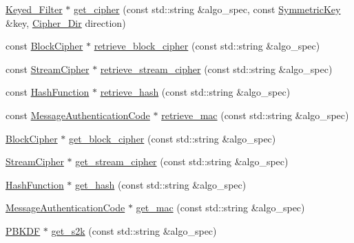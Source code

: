 \begin{DoxyCompactItemize}
\item 
\hyperlink{classBotan_1_1Keyed__Filter}{Keyed\-\_\-\-Filter} $\ast$ \hyperlink{namespaceBotan_a60f4b2b897a27635c66f5b111ccdaa61}{get\-\_\-cipher} (const std\-::string \&algo\-\_\-spec, const \hyperlink{namespaceBotan_a00c78597211d5c63b63e2a57ddb96d38}{Symmetric\-Key} \&key, \hyperlink{namespaceBotan_ad9d14ffdc73fc19966421979b32ee759}{Cipher\-\_\-\-Dir} direction)
\item 
const \hyperlink{classBotan_1_1BlockCipher}{Block\-Cipher} $\ast$ \hyperlink{namespaceBotan_a225427db41ff1be9e376e0ee184ca608}{retrieve\-\_\-block\-\_\-cipher} (const std\-::string \&algo\-\_\-spec)
\item 
const \hyperlink{classBotan_1_1StreamCipher}{Stream\-Cipher} $\ast$ \hyperlink{namespaceBotan_ada7fc76d5b519d1a4565c340d62e1952}{retrieve\-\_\-stream\-\_\-cipher} (const std\-::string \&algo\-\_\-spec)
\item 
const \hyperlink{classBotan_1_1HashFunction}{Hash\-Function} $\ast$ \hyperlink{namespaceBotan_af3a6138a953ee6377a9dc74edc6db5ee}{retrieve\-\_\-hash} (const std\-::string \&algo\-\_\-spec)
\item 
const \hyperlink{classBotan_1_1MessageAuthenticationCode}{Message\-Authentication\-Code} $\ast$ \hyperlink{namespaceBotan_acb0e06ae53e6801bf9218b7447c97ff5}{retrieve\-\_\-mac} (const std\-::string \&algo\-\_\-spec)
\item 
\hyperlink{classBotan_1_1BlockCipher}{Block\-Cipher} $\ast$ \hyperlink{namespaceBotan_abd6b36b95cc341f0161d76056890320d}{get\-\_\-block\-\_\-cipher} (const std\-::string \&algo\-\_\-spec)
\item 
\hyperlink{classBotan_1_1StreamCipher}{Stream\-Cipher} $\ast$ \hyperlink{namespaceBotan_acfb230c2c6e887b898fc0fb393abe0c4}{get\-\_\-stream\-\_\-cipher} (const std\-::string \&algo\-\_\-spec)
\item 
\hyperlink{classBotan_1_1HashFunction}{Hash\-Function} $\ast$ \hyperlink{namespaceBotan_adcf65a19b2515b01036db13f5c3e76ba}{get\-\_\-hash} (const std\-::string \&algo\-\_\-spec)
\item 
\hyperlink{classBotan_1_1MessageAuthenticationCode}{Message\-Authentication\-Code} $\ast$ \hyperlink{namespaceBotan_a1552f483af53acc1ec3a1d780dbbcf68}{get\-\_\-mac} (const std\-::string \&algo\-\_\-spec)
\item 
\hyperlink{classBotan_1_1PBKDF}{P\-B\-K\-D\-F} $\ast$ \hyperlink{namespaceBotan_a5612cc6316fbfb5d5a5b100c9cf7064e}{get\-\_\-s2k} (const std\-::string \&algo\-\_\-spec)
\item 

\end{DoxyCompactItemize}
